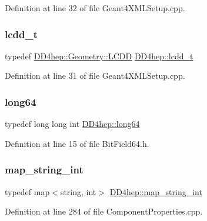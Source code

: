 Definition at line 32 of file Geant4\+X\+M\+L\+Setup.\+cpp.

\hypertarget{namespace_d_d4hep_a9d7154801ec259f2a1d2fe015d140518}{}\label{namespace_d_d4hep_a9d7154801ec259f2a1d2fe015d140518} 
\subsubsection{\texorpdfstring{lcdd\+\_\+t}{lcdd\_t}}
{\footnotesize\ttfamily typedef \hyperlink{class_d_d4hep_1_1_geometry_1_1_l_c_d_d}{D\+D4hep\+::\+Geometry\+::\+L\+C\+DD} \hyperlink{namespace_d_d4hep_a9d7154801ec259f2a1d2fe015d140518}{D\+D4hep\+::lcdd\+\_\+t}}



Definition at line 31 of file Geant4\+X\+M\+L\+Setup.\+cpp.

\hypertarget{namespace_d_d4hep_ac2a70e722b33dc7ddaa20db8954ac836}{}\label{namespace_d_d4hep_ac2a70e722b33dc7ddaa20db8954ac836} 
\subsubsection{\texorpdfstring{long64}{long64}}
{\footnotesize\ttfamily typedef long long int \hyperlink{namespace_d_d4hep_ac2a70e722b33dc7ddaa20db8954ac836}{D\+D4hep\+::long64}}



Definition at line 15 of file Bit\+Field64.\+h.

\hypertarget{namespace_d_d4hep_a5d68f9c863a419d5ed00cc08b473e352}{}\label{namespace_d_d4hep_a5d68f9c863a419d5ed00cc08b473e352} 
\subsubsection{\texorpdfstring{map\+\_\+string\+\_\+int}{map\_string\_int}}
{\footnotesize\ttfamily typedef map$<$string, int$>$ \hyperlink{namespace_d_d4hep_a5d68f9c863a419d5ed00cc08b473e352}{D\+D4hep\+::map\+\_\+string\+\_\+int}}



Definition at line 284 of file Component\+Properties.\+cpp.

\hypertarget{namespace_d_d4hep_a0f6ae5793bad82d7e3c5a6fd76334cf1}{}\label{namespace_d_d4hep_a0f6ae5793bad82d7e3c5a6fd76334cf1} 
